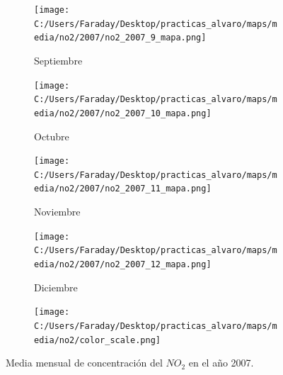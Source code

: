 \documentclass[12pt]{beamer}
\begin{document}
\begin{frame}[squeeze]
\begin{figure}[H]
\begin{subfigure}[H]{0.20\textwidth}
\texttt{[image: C:/Users/Faraday/Desktop/practicas\_alvaro/maps/media/no2/2007/no2\_2007\_9\_mapa.png]}
\captionsetup{labelformat=empty}
\caption{\scriptsize Septiembre}
\label{fig:map-no2-2007-9}
\end{subfigure}
%
\begin{subfigure}[H]{0.20\textwidth}
\texttt{[image: C:/Users/Faraday/Desktop/practicas\_alvaro/maps/media/no2/2007/no2\_2007\_10\_mapa.png]}
\captionsetup{labelformat=empty}
\caption{\scriptsize Octubre}
\label{fig:map-no2-2007-10}
\end{subfigure}
%
\begin{subfigure}[H]{0.20\textwidth}
\texttt{[image: C:/Users/Faraday/Desktop/practicas\_alvaro/maps/media/no2/2007/no2\_2007\_11\_mapa.png]}
\captionsetup{labelformat=empty}
\caption{\scriptsize Noviembre}
\label{fig:map-no2-2007-11}
\end{subfigure}
%
\begin{subfigure}[H]{0.20\textwidth}
\texttt{[image: C:/Users/Faraday/Desktop/practicas\_alvaro/maps/media/no2/2007/no2\_2007\_12\_mapa.png]}
\captionsetup{labelformat=empty}
\caption{\scriptsize Diciembre}
\label{fig:map-no2-2007-12}
\end{subfigure}

\begin{subfigure}[H]{0.45\textwidth}
\texttt{[image: C:/Users/Faraday/Desktop/practicas\_alvaro/maps/media/no2/color\_scale.png]}
\captionsetup{labelformat=empty}
\caption{}
\end{subfigure}

\vspace*{-7mm}
\caption{\scriptsize Media mensual de concentración del $NO_{2}$ en el año 2007.}
\label{fig:map-no2-2007}
\end{figure}
\end{frame}
\end{document}
